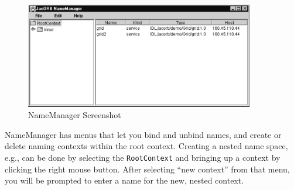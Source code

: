 \bigskip
\begin{figure}[htb]
  \begin{center}
    \includegraphics[width=10cm]{Naming/Nmgr1}
  \end{center}
\caption{NameManager Screenshot}
\label{fig:nameManager}
\end{figure}

NameManager has menus that let you bind and unbind names, and create
or delete naming contexts within the root context. Creating a nested
name space, e.g., can be done by selecting the {\tt RootContext} and
bringing up a context by clicking the right mouse button.  After
selecting ``new context'' from that menu, you will be prompted to
enter a name for the new, nested context.


